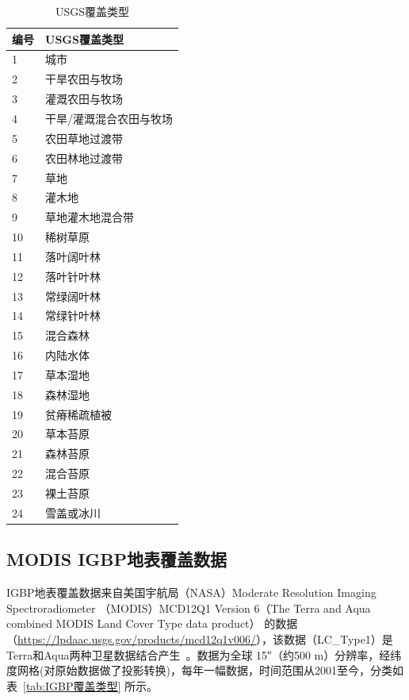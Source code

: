 \begin{table}[htbp]
  \centering
  \caption{USGS覆盖类型}
  \label{tab:USGS覆盖类型}
  \begin{tabular}{@{}ll@{}}
    \toprule
    编号 & USGS覆盖类型            \\ \midrule
    1    & 城市                    \\
    2    & 干旱农田与牧场          \\
    3    & 灌溉农田与牧场          \\
    4    & 干旱/灌溉混合农田与牧场 \\
    5    & 农田草地过渡带          \\
    6    & 农田林地过渡带          \\
    7    & 草地                    \\
    8    & 灌木地                  \\
    9    & 草地灌木地混合带        \\
    10   & 稀树草原                \\
    11   & 落叶阔叶林              \\
    12   & 落叶针叶林              \\
    13   & 常绿阔叶林              \\
    14   & 常绿针叶林              \\
    15   & 混合森林                \\
    16   & 内陆水体                \\
    17   & 草本湿地                \\
    18   & 森林湿地                \\
    19   & 贫瘠稀疏植被            \\
    20   & 草本苔原                \\
    21   & 森林苔原                \\
    22   & 混合苔原                \\
    23   & 裸土苔原                \\
    24   & 雪盖或冰川              \\ \bottomrule
  \end{tabular}
\end{table}

\subsection{MODIS IGBP地表覆盖数据}\label{IGBP地表覆盖数据}
IGBP地表覆盖数据来自美国宇航局（NASA）Moderate Resolution Imaging Spectroradiometer
（MODIS）MCD12Q1 Version 6（The Terra and Aqua combined MODIS Land Cover Type data product）
的数据（\url{https://lpdaac.usgs.gov/products/mcd12q1v006/}），该数据（LC\_Type1）是Terra和Aqua两种卫星数据结合产生~\citep{Friedl2019}。数据为全球 \ang{;;15}（约500 m）分辨率，经纬度网格(对原始数据做了投影转换)，每年一幅数据，时间范围从2001至今，分类如表~\ref{tab:IGBP覆盖类型} 所示。

